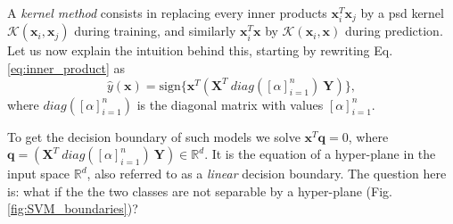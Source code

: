 A \emph{kernel method} consists in replacing every inner products $\mathbf{x}_i^T \mathbf{x}_j$ by a psd kernel $\mathcal{K}(\mathbf{x}_i, \mathbf{x}_j)$ during training, and similarly $\mathbf{x}_i^T\mathbf{x}$ by $\mathcal{K}(\mathbf{x}_i, \mathbf{x})$ during prediction.
Let us now explain the intuition behind this, starting by rewriting Eq. \ref{eq:inner_product} as 
\[
\hat{y}(\mathbf{x})=\text{sign}\{\textbf{x}^T(\mathbf{X}^T~diag([\alpha]_{i=1}^n)~\mathbf{Y})\},
\]
where $diag([\alpha]_{i=1}^n)$ is the diagonal matrix with values $[\alpha]_{i=1}^n$. 

To get the decision boundary of such models we solve $\textbf{x}^T\textbf{q}=0$, where $\textbf{q}=(\mathbf{X}^T~diag([\alpha]_{i=1}^n)~\mathbf{Y})\in\mathbb{R}^d$. It is the equation of a hyper-plane in the input space $\mathbb{R}^d$, also referred to as a \emph{linear} decision boundary. 
The question here is: what if the the two classes are not separable by a hyper-plane (Fig. \ref{fig:SVM_boundaries})? 

